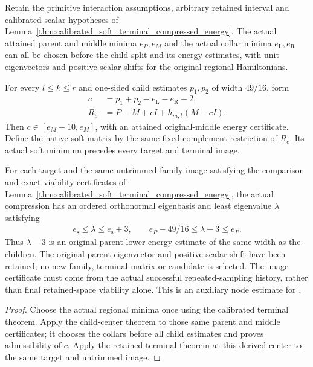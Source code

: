 \begin{lemma}
    \label{thm:calibrated_soft_terminal_node_update}
    \leanok
    Retain the primitive interaction assumptions, arbitrary retained interval
    and calibrated scalar hypotheses of
    Lemma~\ref{thm:calibrated_soft_terminal_compressed_energy}.
    The actual attained parent and middle minima $e_P,e_M$ and the actual
    collar minima $e_{\mathrm L},e_{\mathrm R}$ can all be chosen before
    the child split and its energy estimates, with unit eigenvectors and
    positive scalar shifts for the original regional Hamiltonians.

    For every $l\le k\le r$ and one-sided child estimates $p_1,p_2$ of
    width $49/16$, form
    \begin{align}
        c   & =p_1+p_2-e_{\mathrm L}-e_{\mathrm R}-2, \\
        R_c & =P-M+cI+h_{m,t}(M-cI).
    \end{align}
    Then $c\in[e_M-10,e_M]$, with an attained original-middle energy
    certificate. Define the native soft matrix by the same fixed-complement
    restriction of $R_c$. Its actual soft minimum precedes every target
    and terminal image.

    For each target and the same untrimmed family image satisfying the
    comparison and exact viability certificates of
    Lemma~\ref{thm:calibrated_soft_terminal_compressed_energy}, the actual
    compression has an ordered orthonormal eigenbasis and least eigenvalue
    $\lambda$ satisfying
    \begin{align}
        e_{\mathrm s}\le\lambda\le e_{\mathrm s}+3,\qquad
        e_P-49/16\le\lambda-3\le e_P.
    \end{align}
    Thus $\lambda-3$ is an original-parent lower energy estimate of the
    same width as the children. The original parent eigenvector and positive
    scalar shift have been retained; no new family, terminal matrix or
    candidate is selected. The image certificate must come from the actual
    successful repeated-sampling history, rather than final retained-space
    viability alone. This is an auxiliary node estimate for
    \cite[Figure~\texttt{fig:algo1}, line 1631, and line 1807]{Arad2016RigorousRG}.
\end{lemma}
\begin{proof}\leanok
    Choose the actual regional minima once using the calibrated terminal
    theorem. Apply the child-center theorem to those same parent and middle
    certificates; it chooses the collars before all child estimates and
    proves admissibility of $c$. Apply the retained terminal theorem at
    this derived center to the same target and untrimmed image.
\end{proof}


